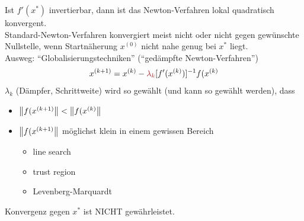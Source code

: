 Ist $f'(x^*)$ invertierbar, dann ist das Newton-Verfahren lokal quadratisch konvergent.\\
Standard-Newton-Verfahren konvergiert meist nicht oder nicht gegen gewünschte Nullstelle,
wenn Startnäherung $x^{(0)}$ nicht nahe genug bei $x^*$ liegt.\\
Ausweg: ``Globalisierungstechniken'' (``gedämpfte Newton-Verfahren'')
\begin{align*}
  x^{(k+1)} = x^{(k)} - \textcolor{rot}{\lambda_k}[f'(x^{(k)})]^{-1} f(x^{(k)}
\end{align*}
$\lambda_k$ (Dämpfer, Schrittweite) wird so gewählt (und kann so gewählt werden), dass
\begin{itemize}
  \item $\left\lVert f(x^{(k+1)} \right\rVert < \left\lVert f(x^{(k)} \right\rVert$
  \item $\left\lVert f(x^{(k+1)} \right\rVert$ möglichst klein in einem gewissen Bereich
    \begin{itemize}
      \item line search
      \item trust region %
      \item Levenberg-Marquardt
    \end{itemize}
\end{itemize}
Konvergenz gegen $x^*$ ist NICHT gewährleistet.\\

